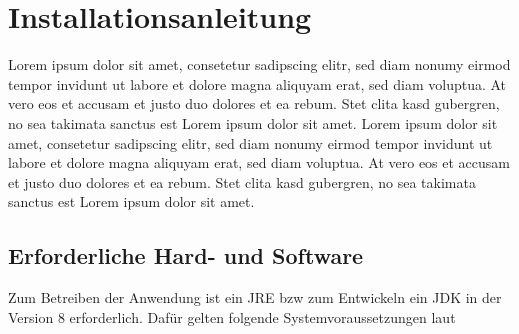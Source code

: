 
\thispagestyle{plain}

\chapter{Installationsanleitung}\label{c_installationsanleitung}
Lorem ipsum dolor sit amet, consetetur sadipscing elitr, sed diam nonumy eirmod tempor invidunt ut labore et dolore magna aliquyam erat, sed diam voluptua. At vero eos et accusam et justo duo dolores et ea rebum. Stet clita kasd gubergren, no sea takimata sanctus est Lorem ipsum dolor sit amet. Lorem ipsum dolor sit amet, consetetur sadipscing elitr, sed diam nonumy eirmod tempor invidunt ut labore et dolore magna aliquyam erat, sed diam voluptua. At vero eos et accusam et justo duo dolores et ea rebum. Stet clita kasd gubergren, no sea takimata sanctus est Lorem ipsum dolor sit amet.


\section{Erforderliche Hard- und Software}\label{s_erforderliche_hw_sw}
Zum Betreiben der Anwendung ist ein \ac{JRE} bzw zum Entwickeln ein \ac{JDK} in der Version 8 erforderlich.
Dafür gelten folgende Systemvoraussetzungen laut \cite{oraclejsv}

